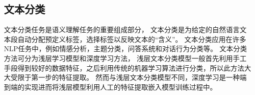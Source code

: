 




\subsection{文本分类}
文本分类任务是语义理解任务的重要组成部分，
文本分类是为给定的自然语言文本段自动分配预定义标签，选择标签以反映文本的“含义”。
文本分类应用在许多NLP任务中，例如情感分析，主题分类，问答系统和对话行为分类等。
文本分类方法可分为浅层学习模型和深度学习方法，
浅层文本分类模型一般首先利用手工手段得到较好的数据特征，之后利用传统的机器学习算法进行分类，所以此方法大大受限于第一步的特征提取。
然而与浅层文本分类模型不同，深度学习是一种端到端的实现进而将浅层模型利用人工的特征提取嵌入模型训练过程中。

